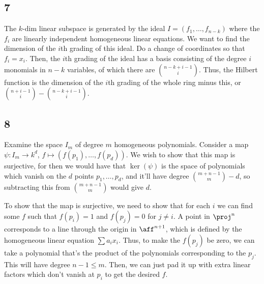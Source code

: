 \documentclass{article}
\begin{document}
\subsection*{7}
The $k$-dim linear subspace is generated by the ideal $I=(f_1,\ldots,f_{n-k})$ where the $f_i$ are linearly independent homogeneous linear equations. We want to find the dimension of the $i$th grading of this ideal. Do a change of coordinates so that $f_i=x_i$. Then, the $i$th grading of the ideal has a basis consisting of the degree $i$ monomials in $n-k$ variables, of which there are $\binom{n-k+i-1}{i}$. Thus, the Hilbert function is the dimension of the $i$th grading of the whole ring minus this, or $\binom{n+i-1}{i}-\binom{n-k+i-1}{i}$.
\subsection*{8}
Examine the space $I_m$ of degree $m$ homogeneous polynomials. Consider a map $\psi:I_m\to k^d$, $f\mapsto (f(p_1),\ldots,f(p_d))$. We wish to show that this map is surjective, for then we would have that $\ker(\psi)$ is the space of polynomials which vanish on the $d$ points $p_1,\ldots,p_d$, and it'll have degree $\binom{m+n-1}{m}-d$, so subtracting this from $\binom{m+n-1}{m}$ would give $d$.

To show that the map is surjective, we need to show that for each $i$ we can find some $f$ such that $f(p_i)=1$ and $f(p_j)=0$ for $j\neq i$. A point in $\proj^n$ corresponds to a line through the origin in $\aff^{n+1}$, which is defined by the homogeneous linear equation $\sum a_ix_i$. Thus, to make the $f(p_j)$ be zero, we can take a polynomial that's the product of the polynomials corresponding to the $p_j$. This will have degree $n-1\leq m$. Then, we can just pad it up with extra linear factors which don't vanish at $p_i$ to get the desired $f$.
\end{document}
